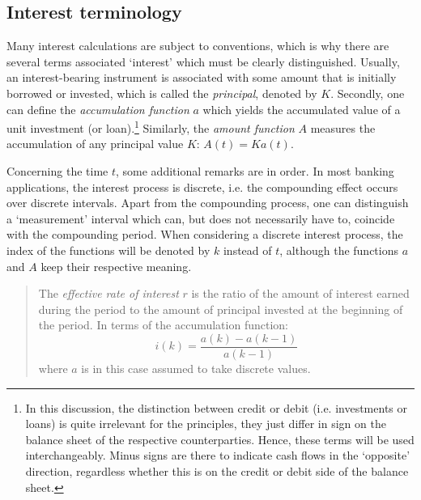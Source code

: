 \subsection{Interest terminology}
Many interest calculations are subject to conventions, which is why there are several terms associated `interest' which must be clearly distinguished. Usually, an interest-bearing instrument is associated with some amount that is initially borrowed or invested, which is called the \emph{principal}, denoted by $K$. Secondly, one can define  the \emph{accumulation function} $a$ which yields the accumulated value of a unit investment (or loan).\footnote{In this discussion, the distinction between credit or debit (i.e. investments or loans) is quite irrelevant for the principles, they just differ in sign on the balance sheet of the respective counterparties. Hence, these terms will be used interchangeably. Minus signs are there to indicate cash flows in the `opposite' direction, regardless whether this is on the credit or debit side of the balance sheet.}
Similarly, the \emph{amount function} $A$ measures the accumulation of any principal value $K$: $A(t) = Ka(t)$. \cite{Kellison1991}

Concerning the time $t$, some additional remarks are in order. In most banking applications, the interest process is discrete, i.e. the compounding effect occurs over discrete intervals. Apart from the compounding process, one can distinguish a `measurement' interval which can, but does not necessarily have to, coincide with the compounding period. When considering a discrete interest process, the index of the functions will be denoted by $k$ instead of $t$, although the functions $a$ and $A$ keep their respective meaning.

\begin{quote}
    The \emph{effective rate of interest} $r$ is the ratio of the amount of interest earned during the period to the amount of principal invested at the beginning of the period. In terms of the accumulation function:
     \begin{equation}
         i(k) = \frac{a(k) - a(k-1)}{a(k-1)}
         \label{eq:effective_interest}
     \end{equation}
     where $a$ is in this case assumed to take discrete values.
\end{quote}

\begin{quote}
    
\end{quote}

